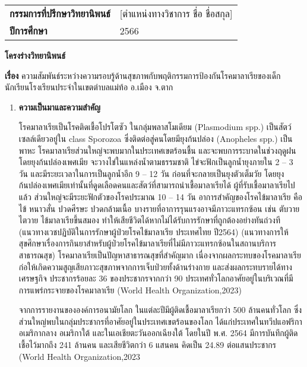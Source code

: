 \begin{titlepage}
\begin{table}[h]
\begin{tabular}{p{4cm} p{11cm}}
      \textbf{กรรมการที่ปรึกษาวิทยานิพนธ์} & [ตำแหน่งทางวิชาการ ชื่อ ชื่อสกุล]                                                                                                     \\

      \textbf{ปีการศึกษา}              & 2566
    \end{tabular}
  \end{table}

  \newpage

  \centering\textbf{โครงร่างวิทยานิพนธ์}


  \raggedright\textbf{เรื่อง} ความสัมพันธ์ระหว่างความรอบรู้ด้านสุขภาพกับพฤติกรรมการป้องกันโรคมาลาเรียของเด็กนักเรียนโรงเรียนประจำในเขตตำบลแม่ท้อ อ.เมือง จ.ตาก

  \begin{enumerate}
    \justifying
    \item \textbf{ความเป็นมาและความสำคัญ}

          โรคมาลาเรียเป็นโรคติดเชื้อโปรโตซัว ในกลุ่มพลาสโมเดียม (Plasmodium spp.) เป็นสัตว์เซลล์เดียวอยู่ใน class Sporozoa  ซึ่งติดต่อสู่คนโดยมียุงก้นปล่อง (Anopheles spp.) เป็นพาหะ โรคมาลาเรียส่วนใหญ่จะพบมากในประเทศเขตร้อนชื้น และจะพบการระบาดในช่วงฤดูฝน โดยยุงก้นปล่องเพศเมีย จะวางไข่ในแหล่งน้ำตามธรรมชาติ ไข่จะฟักเป็นลูกน้ำยุงภายใน 2 – 3 วัน และมีระยะเวลาในการเป็นลูกน้ำอีก 9 – 12 วัน ก่อนที่จะกลายเป็นยุงตัวเต็มวัย โดยยุงก้นปล่องเพศเมียเท่านั้นที่ดูดเลือดคนและสัตว์ที่สามารถนำเชื้อมาลาเรียได้ ผู้ที่รับเชื้อมาลาเรียไปแล้ว ส่วนใหญ่จะมีระยะฟักตัวของโรคประมาณ 10 – 14 วัน อาการสำคัญของโรคไข้มาลาเรีย คือ ไข้ หนาวสั่น ปวดศีรษะ ปวดกล้ามเนื้อ บางรายที่อาการรุนแรงอาจมีภาวะแทรกซ้อน เช่น ตับวาย ไตวาย ไข้มาลาเรียขึ้นสมอง ทำให้เสียชีวิตได้หากไม่ได้รับการรักษาที่ถูกต้องอย่างทันถ่วงที (แนวทางเวชปฏิบัติในการรักษาผู้ป่วยโรคไข้มาลาเรีย ประเทศไทย ปี2564) (แนวทางการให้สุขศึกษาเรื่องการกินยาสำหรับผู้ป่วยโรคไข้มาลาเรียที่ไม่มีภาวะแทรกซ้อนในสถานบริการสาธารณสุข) โรคมาลาเรียเป็นปัญหาสาธารณสุขที่สำคัญมาก เนื่องจากผลกระทบของโรคมาลาเรียก่อให้เกิดความสูญเสียภาวะสุขภาพจากการเจ็บป่วยทั้งด้านร่างกาย  และส่งผลกระทบรายได้ทางเศรษฐกิจ ประชากรร้อยละ 36 ของประชากรจากกว่า 90 ประเทศทั่วโลกอาศัยอยู่ในบริเวณที่มีการแพร่กระจายของโรคมาลาเรีย (World Health Organization,2023)

          จากการรายงานขององค์การอนามัยโลก ในแต่ละปีมีผู้ติดเชื้อมาลาเรียกว่า 500 ล้านคนทั่วโลก ซึ่งส่วนใหญ่พบในกลุ่มประชากรที่อาศัยอยู่ในประเทศเขตร้อนของโลก ได้แก่ประเทศในทวีปแอฟริกา อเมริกากลาง อเมริกาใต้ และในเอเชียตะวันออกเฉียงใต้ โดยในปี พ.ศ. 2564  มีการบันทึกผู้ติดเชื้อไว้มากถึง 241 ล้านคน และเสียชีวิตกว่า 6 แสนคน คิดเป็น 24.89 ต่อแสนประชากร (World Health Organization,2023


\end{enumerate}
\end{titlepage}
